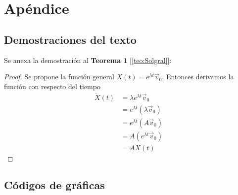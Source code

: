 \chapter{Apéndice}\label{ch:Ap}

\section{Demostraciones del texto}

Se anexa la demostración al \textbf{Teorema 1} [\ref{teo:Solgral}]:
\begin{proof}
	Se propone la función general $X(t)=e^{\lambda t}\vec{v}_0$. Entonces derivamos la función con respecto del tiempo
	\begin{align*}
		\dot{X}(t) &= \lambda e^{\lambda t}\vec{v}_0\\
				   &= e^{\lambda t}(\lambda\vec{v}_0)\\
				   &= e^{\lambda t}(A\vec{v}_0)		\\
				   &= A(e^{\lambda t}\vec{v}_0)\\
				   &= AX(t)
	\end{align*}
\end{proof}

\section{Códigos de gráficas}

